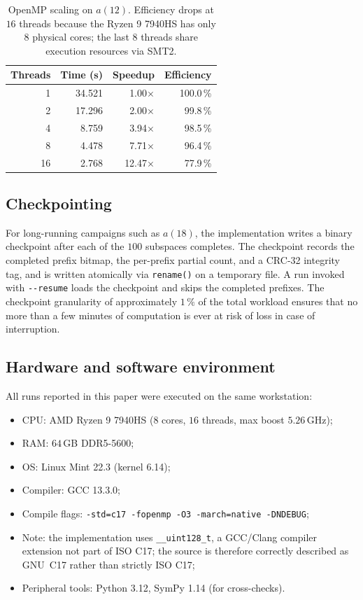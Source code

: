 \documentclass[11pt,a4paper]{article}
\theoremstyle{definition}
\begin{document}
\begin{table}[ht]
  \centering
  \begin{tabular}{r r r r}
    \toprule
    Threads & Time (s) & Speedup & Efficiency\\
    \midrule
    1  & 34.521 &  1.00$\times$ & 100.0\,\%\\
    2  & 17.296 &  2.00$\times$ &  99.8\,\%\\
    4  &  8.759 &  3.94$\times$ &  98.5\,\%\\
    8  &  4.478 &  7.71$\times$ &  96.4\,\%\\
    16 &  2.768 & 12.47$\times$ &  77.9\,\%\\
    \bottomrule
  \end{tabular}
  \caption{OpenMP scaling on $a(12)$. Efficiency drops at $16$ threads
    because the Ryzen 9 7940HS has only $8$ physical cores; the last
    $8$ threads share execution resources via SMT2.}
  \label{tab:scaling}
\end{table}

\subsection{Checkpointing}\label{sec:ckpt}

For long-running campaigns such as $a(18)$, the implementation writes a
binary checkpoint after each of the $100$ subspaces completes. The
checkpoint records the completed prefix bitmap, the per-prefix partial
count, and a CRC-32 integrity tag, and is written atomically via
\verb|rename()| on a temporary file. A run invoked with \verb|--resume|
loads the checkpoint and skips the completed prefixes. The checkpoint
granularity of approximately $1\,\%$ of the total workload ensures that
no more than a few minutes of computation is ever at risk of loss in case
of interruption.

\subsection{Hardware and software environment}\label{sec:env}

All runs reported in this paper were executed on the same workstation:

\begin{itemize}
  \setlength{\itemsep}{0pt}
  \item CPU: AMD Ryzen 9 7940HS ($8$ cores, $16$ threads, max boost $5.26$\,GHz);
  \item RAM: $64$\,GB DDR5-5600;
  \item OS: Linux Mint 22.3 (kernel 6.14);
  \item Compiler: GCC 13.3.0;
  \item Compile flags: \texttt{-std=c17 -fopenmp -O3 -march=native -DNDEBUG};
  \item Note: the implementation uses \texttt{\_\_uint128\_t}, a GCC/Clang
    compiler extension not part of ISO C17; the source is therefore correctly
    described as GNU~C17 rather than strictly ISO C17;
  \item Peripheral tools: Python 3.12, SymPy 1.14 (for cross-checks).
\end{itemize}
\end{document}
